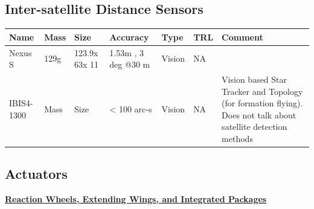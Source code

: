 \subsection{Inter-satellite Distance Sensors}


\begin{center}
     \begin{tabular}{ |p{2cm} | l | l | l | l | l | p{5cm} |}
     \hline

      {\bf Name} & {\bf Mass} & {\bf Size} & {\bf Accuracy} & {\bf Type} & {\bf TRL} & {\bf Comment}  \\ \hline

     Nexus S \cite{Ref:ids2} & 129g & 123.9x 63x 11 & 1.53m , 3 deg @30 m & Vision & NA  &   \\ \hline

     IBIS4-1300 \cite{Ref:ids1} & Mass & Size & < 100 arc-s & Vision & NA & Vision based Star Tracker and Topology (for formation flying). Does not talk about satellite detection methods \\ \hline
     \end{tabular}
\end{center}


\subsection{Actuators}

{\bf {\underline{Reaction Wheels, Extending Wings, and Integrated Packages}}} \\

